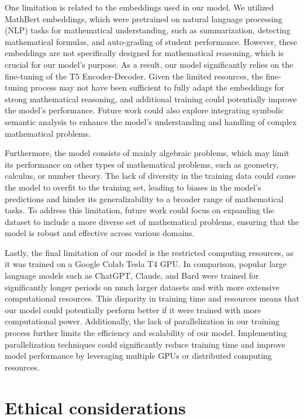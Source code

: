 \documentclass{article}
\begin{document}

One limitation is related to the embeddings used in our model. We utilized MathBert embeddings, which were pretrained on natural language processing (NLP) tasks for mathematical understanding, such as summarization, detecting mathematical formulas, and auto-grading of student performance. However, these embeddings are not specifically designed for mathematical reasoning, which is crucial for our model's purpose. As a result, our model significantly relies on the fine-tuning of the T5 Encoder-Decoder. Given the limited resources, the fine-tuning process may not have been sufficient to fully adapt the embeddings for strong mathematical reasoning, and additional training could potentially improve the model's performance. Future work could also explore integrating symbolic semantic analysis to enhance the model's understanding and handling of complex mathematical problems. \cite{mathBERT}

Furthermore, the model consists of mainly algebraic problems, which may limit its performance on other types of mathematical problems, such as geometry, calculus, or number theory. The lack of diversity in the training data could cause the model to overfit to the training set, leading to biases in the model's predictions and hinder its generalizability to a broader range of mathematical tasks. To address this limitation, future work could focus on expanding the dataset to include a more diverse set of mathematical problems, ensuring that the model is robust and effective across various domains.

Lastly, the final limitation of our model is the restricted computing resources, as it was trained on a Google Colab Tesla T4 GPU. In comparison, popular large language models such as ChatGPT, Claude, and Bard were trained for significantly longer periods on much larger datasets and with more extensive computational resources. This disparity in training time and resources means that our model could potentially perform better if it were trained with more computational power. Additionally, the lack of parallelization in our training process further limits the efficiency and scalability of our model. Implementing parallelization techniques could significantly reduce training time and improve model performance by leveraging multiple GPUs or distributed computing resources.


\section{Ethical considerations}
\end{document}
